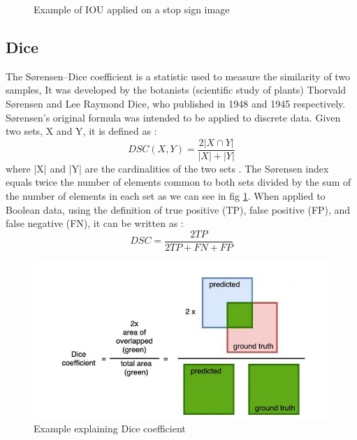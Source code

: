 \begin{figure}[H]
\centering
  \vspace{-0.1in}
    \centerline{}
    \caption{Example of IOU applied on a stop sign image}
\end{figure}

\subsection{Dice}
\hspace{\parindent}
The Sørensen–Dice coefficient is a statistic used to measure the similarity of two samples, It was developed by the botanists (scientific study of plants) Thorvald Sørensen and Lee Raymond Dice, who published in 1948 and 1945 respectively.\\
Sørensen's original formula was intended to be applied to discrete data. Given two sets, X and Y, it is defined as :
\begin{equation}
    DSC(X, Y) = \frac{2 | X \cap Y |}{| X | + | Y |}
\end{equation}
where |X| and |Y| are the cardinalities of the two sets . The Sørensen index equals twice the number of elements common to both sets divided by the sum of the number of elements in each set as we can see in fig \ref{fig:DSC_EX}. 
When applied to Boolean data, using the definition of true positive (TP), false positive (FP), and false negative (FN), it can be written as :
\begin{equation}
    DSC = \frac{2 TP}{2 TP + FN + FP}
\end{equation}

\begin{figure}[H]
\centering
  \vspace{-0.1in}
    \centerline{\includegraphics[width = 4.8in]{../images/DSC.png}}
    \caption{Example explaining Dice coefficient}
    \label{fig:DSC_EX}
\end{figure}

